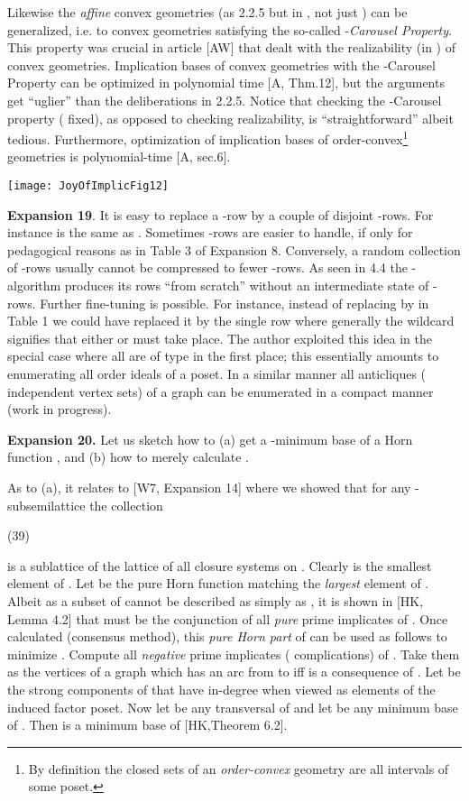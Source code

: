 \documentclass[11pt]{article}
\begin{document}
Likewise the {\it affine} convex geometries (as 2.2.5 but in , not just ) can be generalized, i.e. to convex geometries satisfying  the so-called -{\it Carousel Property}. This property was crucial in article [AW] that dealt with the realizability (in ) of convex geometries. Implication bases of convex geometries with the -Carousel Property can  be optimized in polynomial time [A, Thm.12], but the arguments get 	``uglier'' than the deliberations in 2.2.5. Notice that checking the -Carousel property ( fixed), as opposed to checking realizability, is ``straightforward'' albeit tedious. Furthermore, optimization of implication bases of order-convex\footnote{By definition the closed sets of an {\it order-convex} geometry are all intervals of some poset.} geometries is polynomial-time [A, sec.6].

 

\begin{center}
\texttt{[image: JoyOfImplicFig12]}
\end{center}
 
{\bf Expansion 19}. It is easy to replace a -row by a couple of disjoint -rows. For instance  is the same as . 
Sometimes -rows are easier to handle, if only for pedagogical reasons as in Table 3 of Expansion 8. Conversely, a random collection of -rows usually cannot be compressed to fewer -rows. As seen in 4.4 the -algorithm produces its rows ``from scratch'' without an intermediate state of -rows.
Further fine-tuning is possible. For instance, instead of replacing  by  in Table 1 we could have replaced it by the single row  where generally the wildcard  signifies that either  or  must take place. 
The author exploited this idea in the special case where all  are of type  in the first place; this essentially amounts to enumerating all order ideals of a poset. 
In a similar manner all anticliques ( independent vertex sets) of a graph can be enumerated in a compact manner (work in progress). 
 
 

{\bf Expansion 20.} Let us sketch how to (a) get a -minimum base of a Horn function , and (b) how to merely calculate .

As to (a), it relates to [W7, Expansion 14] where we showed that for any -subsemilattice  the collection

(39) \quad 

is a sublattice of the lattice  of all closure systems on . Clearly  is the smallest element of . Let  be the pure Horn function matching the {\it largest} element  of . Albeit  as a subset of  cannot be described as simply as , it is shown in [HK, Lemma 4.2] that  must be the conjunction of all {\it pure} prime implicates of . Once calculated (consensus method), this {\it pure Horn part}  of  can be used as follows to minimize . Compute all {\it negative} prime implicates ( complications)  of . Take them as the vertices of a graph  which has an arc from  to  iff  is a consequence of . Let  be the strong components of  that have in-degree  when viewed as elements of the induced factor poset. Now let  be any transversal of  and let  be any minimum base of . Then  is a minimum base of  [HK,Theorem 6.2]. 
\end{document}
